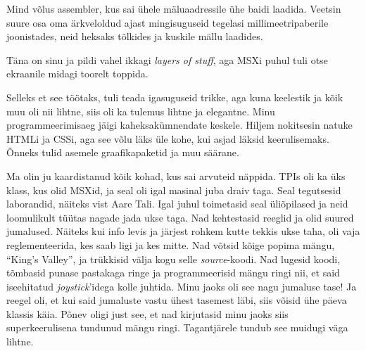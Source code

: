 Mind võlus assembler, kus sai ühele mäluaadressile ühe 
baidi laadida. Veetsin suure osa oma ärkveloldud 
ajast mingisuguseid tegelasi millimeetripaberile joonistades, neid heksaks 
tõlkides ja kuskile mällu laadides. 


Täna on sinu ja pildi vahel ikkagi \emph{layers of stuff}, aga MSXi puhul tuli 
otse ekraanile midagi
toorelt toppida. 


Selleks et see töötaks, tuli teada igasuguseid trikke, aga kuna keelestik ja 
kõik muu oli nii lihtne, siis oli ka tulemus lihtne ja elegantne. Minu
programmeerimisaeg jäigi kaheksakümnendate keskele. Hiljem nokitsesin
natuke HTMLi ja CSSi, aga see võlu läks üle kohe, kui asjad läksid 
keerulisemaks. Õnneks tulid asemele 
graafikapaketid ja muu säärane. 


Ma olin ju kaardistanud kõik kohad, kus sai arvuteid 
näppida. TPIs oli ka üks klass, kus olid 
MSXid, ja seal oli igal masinal juba draiv taga. 
Seal tegutsesid laborandid, näiteks vist Aare Tali. Igal juhul toimetasid seal 
üliõpilased ja neid loomulikult tüütas nagade jada ukse taga. Nad kehtestasid 
reeglid ja olid suured jumalused. Näiteks kui info levis ja järjest 
rohkem kutte tekkis ukse taha, oli vaja reglementeerida, kes saab 
ligi ja kes mitte. 
Nad võtsid kõige popima mängu, \enquote{King's Valley}, ja trükkisid 
välja kogu selle 
\emph{source}-koodi. Nad lugesid koodi, tõmbasid punase pastakaga ringe ja 
programmeerisid mängu ringi nii, 
et said iseehitatud \emph{joystick}'idega kolle juhtida. Minu jaoks oli see 
nagu jumaluse tase! 
Ja reegel oli, et kui said 
jumaluste vastu ühest tasemest läbi, siis võisid ühe päeva klassis käia. Põnev 
oligi just see, et nad kirjutasid
minu jaoks siis superkeerulisena tundunud mängu ringi. Tagantjärele tundub see 
muidugi väga lihtne.


